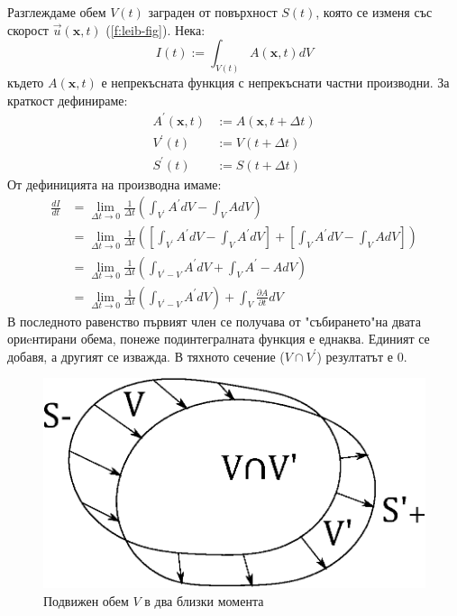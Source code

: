 \documentclass[12pt]{article}
\numberwithin{equation}{section}
\begin{document}
Разглеждаме обем $V(t)$ заграден от повърхност $S(t)$, която се изменя със скорост $\vec{u}(\mathbf{x}, t)$ (\autoref{f:leib-fig}). Нека:
\begin{equation}
    I(t):=\int_{V(t)}A(\mathbf{x}, t)dV
\end{equation}
където $A(\mathbf{x}, t)$ е непрекъсната функция с непрекъснати частни производни. За краткост дефинираме:
\begin{equation}
    \begin{aligned}
        A^\prime(\mathbf{x}, t)&:=A(\mathbf{x}, t+\Delta t) \\
        V^\prime(t)&:=V(t+\Delta t) \\
        S^\prime(t)&:=S(t+\Delta t)
    \end{aligned}
\end{equation}
От дефиницията на производна имаме:
\begin{equation}
    \label{e:leib-parts}
    \begin{aligned}
        \frac{dI}{dt}&=\underset{\Delta t \rightarrow 0}{\lim}\frac{1}{\Delta t} \left( \int_{V^\prime}A^\prime dV -\int_{V}AdV \right) \\
        &=\underset{\Delta t \rightarrow 0}{\lim}\frac{1}{\Delta t} \left(\left[ \int_{V^\prime}A^\prime dV -\int_{V}A^\prime dV \right] + \left[ \int_{V}A^\prime dV -\int_{V}AdV \right] \right) \\
        &=\underset{\Delta t \rightarrow 0}{\lim}\frac{1}{\Delta t} \left( \int_{V^\prime -V}A^\prime dV +\int_{V}A^\prime-A dV \right) \\
        &=\underset{\Delta t \rightarrow 0}{\lim}\frac{1}{\Delta t} \left( \int_{V^\prime -V}A^\prime dV \right) +\int_{V}\frac{\partial A}{\partial t} dV
    \end{aligned}
\end{equation}
В последното равенство първият член се получава от "събирането"\space на двата ориeнтирани обема, понеже подинтегралната функция е еднаква. Единият се добавя, а другият се изважда. В тяхното сечение ($V\cap V^\prime$) резултатът е 0.

\begin{figure}[h]
    \centering
    \includegraphics{figures/leib_proof.eps}
    \caption{Подвижен обем $V$ в два близки момента}
    \label{f:leib-fig}
\end{figure}
\end{document}
